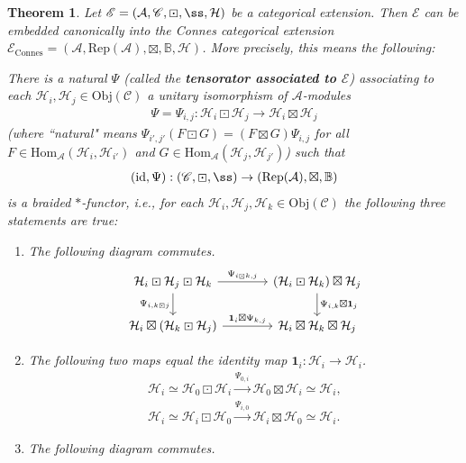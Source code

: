 \documentclass[11pt,b5paper,notitlepage]{article}
\theoremstyle{definition}
\theoremstyle{plain}
\newtheorem{thm}[df]{Theorem}
\newcommand{\mc}{\mathcal}
\newcommand{\idt}{\mathbf{1}}
\newcommand{\id}{\mathrm{id}}
\newcommand{\Hom}{\mathrm{Hom}}
\newcommand{\Rep}{\mathrm{Rep}}
\newcommand{\scr}{\mathscr}
\newcommand{\mbb}{\mathbb}
\newcommand{\Obj}{\mathrm{Obj}}
\numberwithin{equation}{section}
\begin{document}
\begin{thm}\label{lb1}
Let $\scr E=(\mc A,\scr C,\boxdot,\ss,\mc H)$ be a categorical extension. Then $\scr E$ can be embedded canonically into the Connes categorical extension $\scr E_{\mathrm{Connes}}=(\mc A,\Rep(\mc A),\boxtimes,\mbb B,\mc H)$. More precisely, this means the following:

There is a natural $\Psi$ (called the \textbf{tensorator associated to $\scr E$}) associating to each $\mc H_i,\mc H_j\in\Obj(\scr C)$ a unitary isomorphism of $\mc A$-modules
\begin{align}
\Psi=\Psi_{i,j}:\mc H_i\boxdot\mc H_j\rightarrow\mc H_i\boxtimes\mc H_j
\end{align}
(where ``natural" means  $\Psi_{i',j'}(F\boxdot G)=(F\boxtimes G)\Psi_{i,j}$ for all $F\in\Hom_{\mc A}(\mc H_i,\mc H_{i'})$ and $G\in\Hom_{\mc A}(\mc H_j,\mc H_{j'})$) such that 
\begin{align}\label{eq90}
(\id,\Psi):(\scr C,\boxdot,\ss)\rightarrow(\Rep(\mc A),\boxtimes,\mbb B)
\end{align}
is a braided $*$-functor, i.e., for each $\mc H_i,\mc H_j,\mc H_k\in\Obj(\scr C)$ the following three statements are true:
\begin{enumerate}[label=(\alph*)]
\item The following diagram commutes.
\begin{equation}
\begin{tikzcd}[column sep=large]
\mc H_i\boxdot\mc H_j\boxdot\mc H_k \arrow[r,"\Psi_{i\boxdot k,j}"] \arrow[d,"\Psi_{i,k\boxdot j}"'] &  \arrow[d,"\Psi_{i,k}\boxtimes\idt_j"](\mc H_i\boxdot\mc H_k)\boxtimes\mc H_j \\
\mc H_i\boxtimes(\mc H_k\boxdot\mc H_j) \arrow[r,"\idt_i\boxtimes \Psi_{k,j}"]           & \mc H_i\boxtimes\mc H_k\boxtimes\mc H_j          
\end{tikzcd}
\end{equation}
\item The following two maps equal the identity map $\idt_i:\mc H_i\rightarrow\mc H_i$.
\begin{subequations}\label{eq61}
	\begin{gather}
	\mc H_i\simeq \mc H_0\boxdot\mc H_i\xrightarrow{\Psi_{0,i}} \mc H_0\boxtimes\mc H_i\simeq\mc H_i,\\
	\mc H_i\simeq \mc H_i\boxdot\mc H_0\xrightarrow{\Psi_{i,0}} \mc H_i\boxtimes\mc H_0\simeq\mc H_i. 
	\end{gather}
\end{subequations}
\item The following diagram commutes.

\end{enumerate}
\end{thm}
\end{document}
